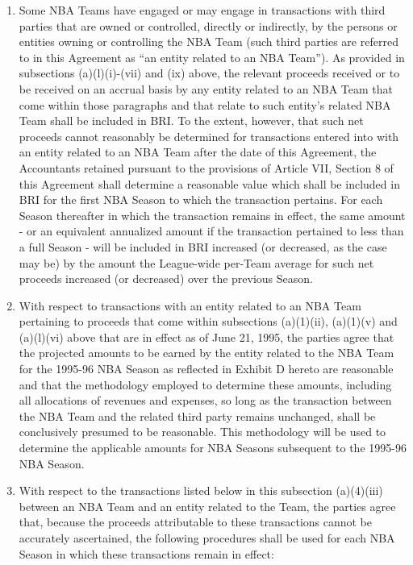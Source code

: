 \documentclass[
]{book}
\providecommand{\tightlist}{%
  \setlength{\itemsep}{0pt}\setlength{\parskip}{0pt}}
\begin{document}
\begin{enumerate}
\begin{enumerate}
    \begin{enumerate}
    \def\labelenumiii{(\roman{enumiii})}
    \tightlist
    \item
      Some NBA Teams have engaged or may engage in transactions with third parties that are owned or controlled, directly or indirectly, by the persons or entities owning or controlling the NBA Team (such third parties are referred to in this Agreement as ``an entity related to an NBA Team''). As provided in subsections (a)(l)(i)-(vii) and (ix) above, the relevant proceeds received or to be received on an accrual basis by any entity related to an NBA Team that come within those paragraphs and that relate to such entity's related NBA Team shall be included in BRI. To the extent, however, that such net proceeds cannot reasonably be determined for transactions entered into with an entity related to an NBA Team after the date of this Agreement, the Accountants retained pursuant to the provisions of Article VII, Section 8 of this Agreement shall determine a reasonable value which shall be included in BRI for the first NBA Season to which the transaction pertains. For each Season thereafter in which the transaction remains in effect, the same amount - or an equivalent annualized amount if the transaction pertained to less than a full Season - will be included in BRI increased (or decreased, as the case may be) by the amount the League-wide per-Team average for such net proceeds increased (or decreased) over the previous Season.
    \item
      With respect to transactions with an entity related to an NBA Team pertaining to proceeds that come within subsections (a)(1)(ii), (a)(1)(v) and (a)(l)(vi) above that are in effect as of June 21, 1995, the parties agree that the projected amounts to be earned by the entity related to the NBA Team for the 1995-96 NBA Season as reflected in Exhibit D hereto are reasonable and that the methodology employed to determine these amounts, including all allocations of revenues and expenses, so long as the transaction between the NBA Team and the related third party remains unchanged, shall be conclusively presumed to be reasonable. This methodology will be used to determine the applicable amounts for NBA Seasons subsequent to the 1995-96 NBA Season.
    \item
      With respect to the transactions listed below in this subsection (a)(4)(iii) between an NBA Team and an entity related to the Team, the parties agree that, because the proceeds attributable to these transactions cannot be accurately ascertained, the following procedures shall be used for each NBA Season in which these transactions remain in effect:

\end{enumerate}
\end{enumerate}
\end{enumerate}
\end{document}
